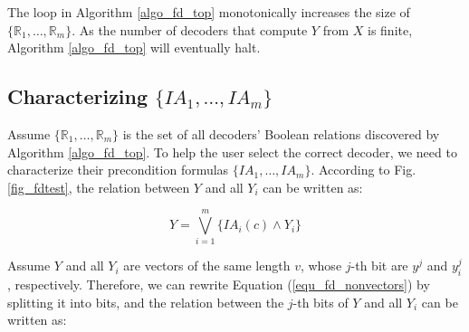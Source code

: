 \documentclass[journal]{IEEEtran}
\begin{document}
The loop in Algorithm \ref{algo_fd_top} monotonically increases the size of $\{\mathbb{R}_1,\dots,\mathbb{R}_m\}$.
As the number of decoders that compute $Y$ from $X$ is finite,
Algorithm \ref{algo_fd_top} will eventually halt.



\subsection{Characterizing $\{IA_1,\dots,IA_{m}\}$}\label{subsec_charia}
Assume $\{\mathbb{R}_1,\dots,\mathbb{R}_{m}\}$ is the set of all decoders' Boolean relations discovered by Algorithm \ref{algo_fd_top}.
To help the user select the correct decoder,
we need to characterize their precondition formulas $\{IA_1,\dots,IA_{m}\}$.
According to Fig. \ref{fig_fdtest},
the relation between $Y$ and all $Y_i$ can be written as:

\begin{equation}\label{equ_fd_nonvectors}
Y=\bigvee _{i=1}^{m} \{IA_i(c)\wedge Y_i\}
\end{equation}

Assume $Y$ and all $Y_i$ are vectors of the same length $v$,
whose $j$-th bit are $y^j$ and $y_i^j$,
respectively.
Therefore,
we can rewrite Equation (\ref{equ_fd_nonvectors}) by splitting it into bits,
and the relation between the $j$-th bits of $Y$ and all $Y_i$ can be written as:

\end{document}
